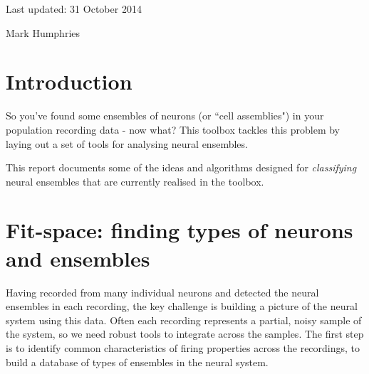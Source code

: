 \documentclass[11pt,a4paper]{article}
\begin{document}

\vspace{5mm}

\noindent Last updated: 31 October 2014

\vspace{5mm}

\noindent Mark Humphries
\vspace{5mm}

\tableofcontents

\vspace{0.5cm}

\section{Introduction}
So you've found some ensembles of neurons (or ``cell assemblies") in your population recording data - now what? This toolbox tackles this problem by laying out a set of tools for analysing neural ensembles.

This report documents some of the ideas and algorithms designed for {\em classifying} neural ensembles that are currently realised in the toolbox.

\section{Fit-space: finding types of neurons and ensembles}

Having recorded from many individual neurons and detected the neural ensembles in each recording, the key challenge is building a picture of the neural system using this data. Often each recording represents a partial, noisy sample of the system, so we need robust tools to integrate across the samples. The first step is to identify common characteristics of firing properties across the recordings, to build a database of types of ensembles in the neural system.
\end{document}
